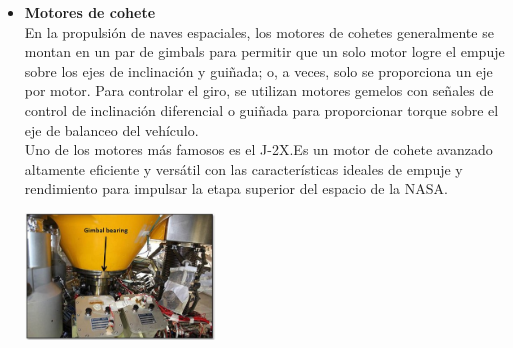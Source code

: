 \begin{itemize}
	\item \textbf{Motores de cohete}\\
	      En la propulsión de naves espaciales, los motores de cohetes generalmente se
	      montan en un par de gimbals para permitir que un solo motor logre el empuje
	      sobre los ejes de inclinación y guiñada; o, a veces, solo se proporciona un eje
	      por motor. Para controlar el giro, se utilizan motores gemelos con señales de
	      control de inclinación diferencial o guiñada para proporcionar torque sobre el
	      eje de balanceo del vehículo.\\
	      Uno de los motores más famosos es el J-2X.Es un motor de cohete avanzado altamente
	      eficiente y versátil con las características ideales de empuje y rendimiento para
	      impulsar la etapa superior del espacio de la NASA.\cite{WEB:NASA}
	      \begin{center}
		      \includegraphics[width=0.4\textwidth]{Contenido/Cuerpo/Capitulo1/Fig2.eps}
		      \label{fig:Introduccion:Fig3}
	      \end{center}


\end{itemize}
